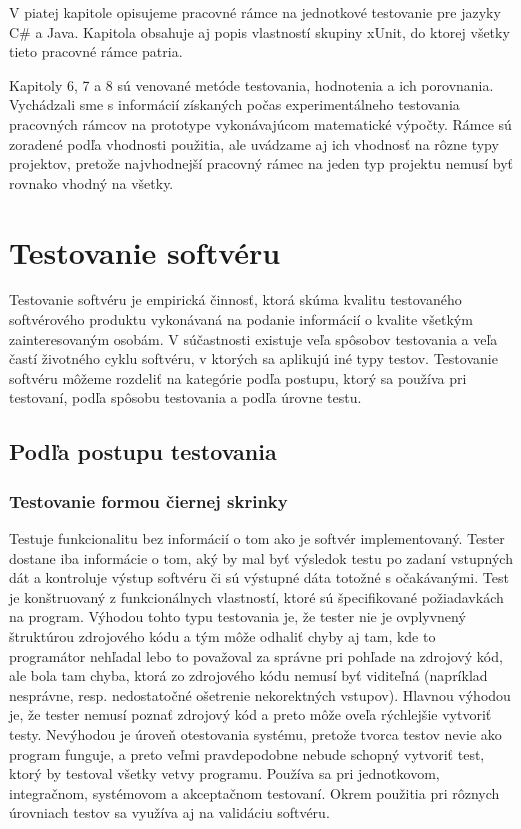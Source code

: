 \documentclass[11pt,twoside,slovak,a4paper]{article}
\begin{document}
	V piatej kapitole opisujeme pracovné rámce na jednotkové testovanie pre jazyky C\# a Java. Kapitola obsahuje aj popis vlastností skupiny xUnit, do ktorej všetky tieto pracovné rámce patria.
	
	Kapitoly 6, 7 a 8 sú venované metóde testovania, hodnotenia a ich porovnania. Vychádzali sme s informácií získaných počas experimentálneho testovania pracovných rámcov na prototype vykonávajúcom matematické výpočty. Rámce sú zoradené podľa vhodnosti použitia, ale uvádzame aj ich vhodnosť na rôzne typy projektov, pretože najvhodnejší pracovný rámec na jeden typ projektu nemusí byť rovnako vhodný na všetky.	
	
	\newpage
	\thispagestyle{plain}
	\section{Testovanie softvéru}
	Testovanie softvéru je empirická činnosť, ktorá skúma kvalitu testovaného softvérového produktu vykonávaná na podanie informácií o kvalite všetkým zainteresovaným osobám\cite{Kaner2006}. V súčastnosti existuje veľa spôsobov testovania a veľa častí životného cyklu softvéru, v ktorých sa aplikujú iné typy testov. Testovanie softvéru môžeme rozdeliť na kategórie podľa postupu, ktorý sa používa pri testovaní, podľa spôsobu testovania a podľa úrovne testu.
	
	\subsection{Podľa postupu testovania}
		\subsubsection{Testovanie formou čiernej skrinky} 
			Testuje funkcionalitu bez informácií o tom ako je softvér implementovaný. Tester dostane iba informácie o tom, aký by mal byť výsledok testu po zadaní vstupných dát a kontroluje výstup softvéru či sú výstupné dáta totožné s očakávanými\cite{EST2002}. Test je konštruovaný z funkcionálnych vlastností, ktoré sú špecifikované požiadavkách na program\cite{Moha1991}.  Výhodou tohto typu testovania je, že tester nie je ovplyvnený štruktúrou zdrojového kódu a tým môže odhaliť chyby aj tam, kde to programátor nehľadal lebo to považoval za správne pri pohľade na zdrojový kód, ale bola tam chyba, ktorá zo zdrojového kódu nemusí byť viditeľná (napríklad nesprávne, resp. nedostatočné ošetrenie nekorektných vstupov). Hlavnou výhodou je, že tester nemusí poznať zdrojový kód a preto môže oveľa rýchlejšie vytvoriť testy. Nevýhodou je úroveň otestovania systému, pretože tvorca testov nevie ako program funguje, a preto veľmi pravdepodobne nebude schopný vytvoriť test, ktorý by testoval všetky vetvy programu. Používa sa pri jednotkovom, integračnom, systémovom a akceptačnom testovaní. Okrem použitia pri rôznych úrovniach testov sa využíva aj na validáciu softvéru\cite{EST2002}.
\end{document}
